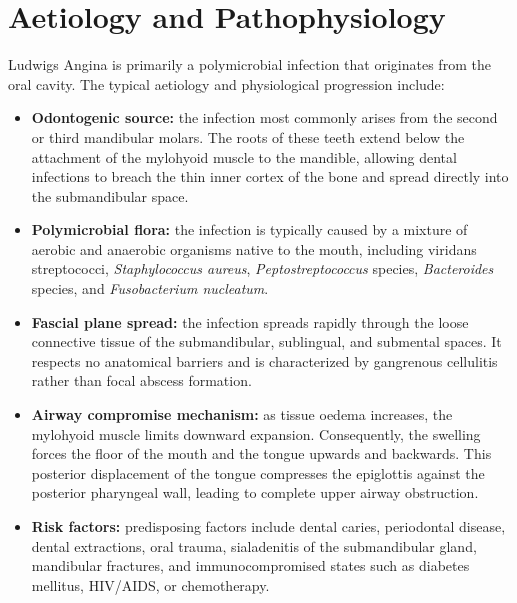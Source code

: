 \section*{Aetiology and Pathophysiology}
Ludwigs Angina is primarily a polymicrobial infection that originates from the oral cavity. The typical aetiology and physiological progression include:
\begin{itemize}
    \item \textbf{Odontogenic source:} the infection most commonly arises from the second or third mandibular molars. The roots of these teeth extend below the attachment of the mylohyoid muscle to the mandible, allowing dental infections to breach the thin inner cortex of the bone and spread directly into the submandibular space.
    \item \textbf{Polymicrobial flora:} the infection is typically caused by a mixture of aerobic and anaerobic organisms native to the mouth, including viridans streptococci, \textit{Staphylococcus aureus}, \textit{Peptostreptococcus} species, \textit{Bacteroides} species, and \textit{Fusobacterium nucleatum}.
    \item \textbf{Fascial plane spread:} the infection spreads rapidly through the loose connective tissue of the submandibular, sublingual, and submental spaces. It respects no anatomical barriers and is characterized by gangrenous cellulitis rather than focal abscess formation.
    \item \textbf{Airway compromise mechanism:} as tissue oedema increases, the mylohyoid muscle limits downward expansion. Consequently, the swelling forces the floor of the mouth and the tongue upwards and backwards. This posterior displacement of the tongue compresses the epiglottis against the posterior pharyngeal wall, leading to complete upper airway obstruction.
    \item \textbf{Risk factors:} predisposing factors include dental caries, periodontal disease, dental extractions, oral trauma, sialadenitis of the submandibular gland, mandibular fractures, and immunocompromised states such as diabetes mellitus, HIV/AIDS, or chemotherapy.
\end{itemize}

